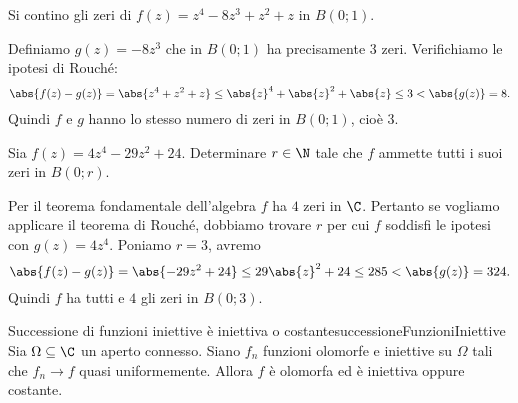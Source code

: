 \begin{exeN}[Esercitazione 22/11]
	Si contino gli zeri di \(f(z)=z^4-8z^3+z^2+z\) in \(B(0;1)\).
\end{exeN}

\begin{sol}
	Definiamo \(g(z)=-8z^3\) che in \(B(0;1)\) ha precisamente \(3\) zeri. Verifichiamo le ipotesi di Rouché:
	\[
		\abs{f(z)-g(z)} = \abs{z^4+z^2+z} \le \abs{z}^4+\abs{z}^2+\abs{z} \le 3 < \abs{g(z)}=8.
	\]
	Quindi \(f\) e \(g\) hanno lo stesso numero di zeri in \(B(0;1)\), cioè \(3\).
\end{sol}

\begin{exeN}[Esercitazione 22/11]
	Sia \(f(z)=4z^4-29z^2+24\). Determinare \(r\in\N\) tale che \(f\) ammette tutti i suoi zeri in \(B(0;r)\).
\end{exeN}

\begin{sol}
	Per il teorema fondamentale dell'algebra \(f\) ha \(4\) zeri in \(\C\). Pertanto se vogliamo applicare il teorema di Rouché, dobbiamo trovare \(r\) per cui \(f\) soddisfi le ipotesi con \(g(z)=4z^4\). Poniamo \(r=3\), avremo
	\[
		\abs{f(z)-g(z)} = \abs{-29z^2+24} \le 29\abs{z}^2+24 \le 285 < \abs{g(z)} = 324.
	\]
	Quindi \(f\) ha tutti e \(4\) gli zeri in \(B(0;3)\).
\end{sol}

\begin{prop}{Successione di funzioni iniettive è iniettiva o costante}{successioneFunzioniIniettive}
	Sia \(\Omega\subseteq \C\) un aperto connesso. Siano \(f_n\) funzioni olomorfe e iniettive su \(\Omega\) tali che \(f_n \to f\) quasi uniformemente. Allora \(f\) è olomorfa ed è iniettiva oppure costante.
\end{prop}

